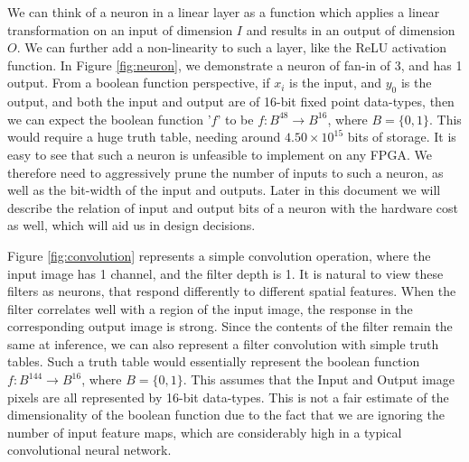 We can think of a neuron in a linear layer as a function which applies a linear transformation on an input of dimension $I$ and results in an output of dimension $O$. We can further add a non-linearity to such a layer, like the ReLU activation function. In Figure \ref{fig:neuron}, we demonstrate a neuron of fan-in of 3, and has 1 output. From a boolean function perspective, if $x_{i}$ is the input, and $y_{0}$ is the output, and both the input and output are of 16-bit fixed point data-types, then we can expect the boolean function '$f$' to be $f : B^{48} \rightarrow B^{16}$, where $B = \{0, 1\}$. This would require a huge truth table, needing around $4.50\times10^{15}$ bits of storage. It is easy to see that such a neuron is unfeasible to implement on any FPGA. We therefore need to aggressively prune the number of inputs to such a neuron, as well as the bit-width of the input and outputs. Later in this document we will describe the relation of input and output bits of a neuron with the hardware cost as well, which will aid us in design decisions.

Figure \ref{fig:convolution} represents a simple convolution operation, where the input image has 1 channel, and the filter depth is 1. It is natural to view these filters as neurons, that respond differently to different spatial features. When the filter correlates well with a region of the input image, the response in the corresponding output image is strong. Since the contents of the filter remain the same at inference, we can also represent a filter convolution with simple truth tables. Such a truth table would essentially represent the boolean function $f : B^{144} \rightarrow B^{16}$, where $B = \{0, 1\}$. This assumes that the Input and Output image pixels are all represented by 16-bit data-types. This is not a fair estimate of the dimensionality of the boolean function due to the fact that we are ignoring the number of input feature maps, which are considerably high in a typical convolutional neural network.


